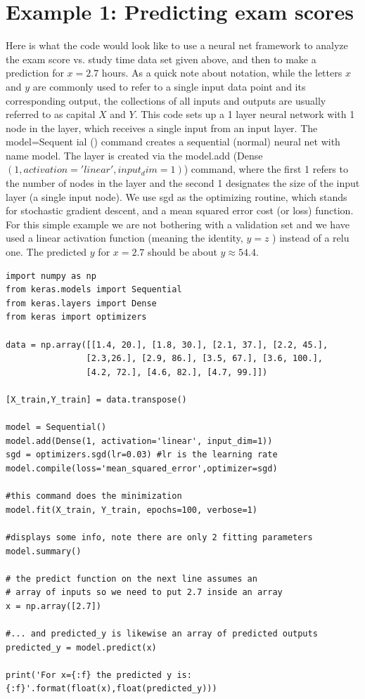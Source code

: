 \documentclass{book}
\theoremstyle{plain}
\theoremstyle{definition}
\numberwithin{exm}{chapter}
\theoremstyle{remark}
\theoremstyle{summary}
\theoremstyle{overview}
\begin{document}
\section*{Example 1: Predicting exam scores}
Here is what the code would look like to use a neural net framework to analyze the exam score vs. study time data set given above, and then to make a prediction for $x=2.7$ hours. As a quick note about notation, while the letters $x$ and $y$ are commonly used to refer to a single input data point and its corresponding output, the collections of all inputs and outputs are usually referred to as capital $X$ and $Y$.
This code sets up a 1 layer neural network with 1 node in the layer, which receives a single input from an input layer. The model=Sequent ial () command creates a sequential (normal) neural net with name model. The layer is created via the model.add (Dense $(1, act ivation='linear', input_dim=1)$) command, where the first 1 refers to the number of nodes in the layer and the second 1 designates the size of the input layer (a single input node). We use sgd as the optimizing routine, which stands for stochastic gradient descent, and a mean squared error cost (or loss) function. For this simple example we are not bothering with a validation set and we have used a linear activation function (meaning the identity, $y=z$ ) instead of a relu one. The predicted $y$ for $x=2.7$ should be about $y \approx 54.4$.
\begin{lstlisting}
import numpy as np
from keras.models import Sequential
from keras.layers import Dense
from keras import optimizers

data = np.array([[1.4, 20.], [1.8, 30.], [2.1, 37.], [2.2, 45.],
				[2.3,26.], [2.9, 86.], [3.5, 67.], [3.6, 100.],
				[4.2, 72.], [4.6, 82.], [4.7, 99.]])
				
[X_train,Y_train] = data.transpose()

model = Sequential()
model.add(Dense(1, activation='linear', input_dim=1))
sgd = optimizers.sgd(lr=0.03) #lr is the learning rate
model.compile(loss='mean_squared_error',optimizer=sgd)

#this command does the minimization
model.fit(X_train, Y_train, epochs=100, verbose=1)

#displays some info, note there are only 2 fitting parameters
model.summary()

# the predict function on the next line assumes an
# array of inputs so we need to put 2.7 inside an array
x = np.array([2.7])

#... and predicted_y is likewise an array of predicted outputs
predicted_y = model.predict(x)

print('For x={:f} the predicted y is: {:f}'.format(float(x),float(predicted_y)))
\end{lstlisting}
\end{document}
